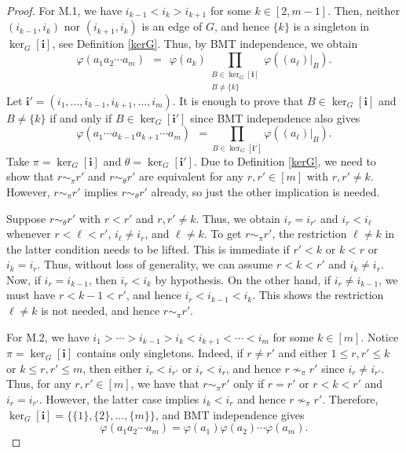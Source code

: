 \documentclass[a4paper,12pt]{extarticle}
\theoremstyle{definition}
\theoremstyle{remark}
\begin{document}
\begin{proof}
	
	For M.1, we have $ i_{k-1} < i_k >  i_{k+1}$ for some $k \in [2,m-1]$. 
	Then, neither $(i_{k-1},i_k)$ nor $(i_{k+1},i_k)$ is an edge of $G$, and hence $\{k\}$ is a singleton in $\ker_G[\bm{i}]$, see Definition \ref{kerG}. 
	Thus, by BMT independence, we obtain 
	\[
	\varphi( a_1 a_2 \cdots a_m ) 
	\ \ =  \ \ 
			\varphi(a_{k})  
			\prod_{\substack{B \in \ker_G[\bm{i}]\\ B \neq\{k\}}} 
			\varphi((a_{\ell})|_B) .
	\]
	Let $\bm{i}' = (i_1,\ldots,i_{k-1},i_{k+1},\ldots,i_m)$. 
	It is enough to prove that $B \in \ker_G[\bm{i}]$ and $B \neq\{k\}$ if and only if $B \in \ker_G[\bm{i}']$ since BMT independence also gives  
	\[ 
	\varphi(a_1 \cdots a_{k-1}a_{k+1}\cdots a_m)
	\ \ = 
			\prod_{B \in \ker_G[\bm{i}']}
				\varphi((a_{\ell})|_B). 
	\]
	Take $\pi=\ker_G[\bm{i}]$ and $\theta = \ker_G[\bm{i}']$. 
	Due to Definition \ref{kerG}, we need to show that $r\sim_\pi r'$ and $r\sim_\theta r'$ are equivalent for any $r, r' \in  [m] $ with $r,r'  \neq k$. 
	However, $r\sim_\pi r'$ implies $r\sim_\theta r'$ already, so just the other implication is needed. 

	Suppose $r\sim_\theta r'$ with $r<r'$ and $r,r'  \neq k$. 
	Thus, we obtain $i_r=i_{r'}$  and $i_r < i_{\ell}$ whenever $r< \ell <r'$, $i_\ell \neq i_r$, and $\ell \neq k$. 
	To get $r\sim_\pi r'$, the restriction $\ell \neq k$ in the latter condition needs to be lifted.  
	This is immediate if $r' < k$ or $k < r$ or $i_k = i_r$. 
	Thus, without loss of generality, we can assume $r<k<r'$ and $i_k \neq i_r$. 
	Now, if $i_r = i_{k-1}$, then $i_r < i_k$ by hypothesis.  
	On the other hand, if  $i_r \neq i_{k-1}$, we must have $r < k-1 < r'$, and hence $i_r < i_{k-1} < i_k$.
	This shows the restriction $\ell \neq k$ is not needed, and hence $r\sim_\pi r'$. 

	
	For M.2, we have $i_1 > \cdots > i_{k-1} > i_k < i_{k+1} < \cdots < i_m$ for some $k \in [m]$.  
	Notice $\pi=\ker_G[\bm{i}]$ contains only singletons. 
	Indeed, if $r\neq r'$ and either $1 \leq r,r' \leq k$ or $k \leq r,r' \leq m$, then either $i_r < i_{r'}$ or  $i_{r} < i_{r}$, and hence $r \nsim_\pi r'$ since 	 $i_r \neq i_{r'}$. 
	Thus, for any $r,r' \in [m]$, we have that $r \sim_\pi r'$ only if $r = r'$ or $r < k < r'$ and $i_r = i_{r'}$. 
	However, the latter case implies $i_k < i_r$ and hence $r \nsim_\pi r'$. 
	Therefore, $\ker_G[\bm{i}] = \{\{1\},\{2\},\ldots,\{m\}\}$, and BMT independence gives 
	\[
	\varphi(a_1 a_2 \cdots a_m ) = \varphi(a_1) \varphi(a_2) \cdots \varphi(a_m).
	\]
\end{proof}
\end{document}
